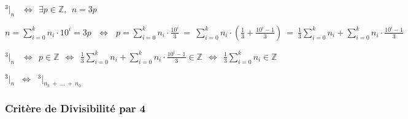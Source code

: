 \documentclass[a4paper]{article}
\begin{document}
\begin{center}
	{\LARGE $^3|_n$} $ ~~ \Longleftrightarrow ~~ \exists p \in \mathbb{Z}, ~~ n = 3p $\\
	
	\vspace{2mm}
		
	{\normalsize $ n = \sum\limits_{i=0}^k n_i \cdot 10^i = 3p ~~~ \Longleftrightarrow ~~~ p = \sum\limits_{i=0}^k n_i \cdot \frac{10^i}{3} ~ = ~ \sum\limits_{i=0}^k n_i \cdot \left( \frac{1}{3} + \frac{10^i-1}{3} \right) ~ = ~ \frac{1}{3} \sum\limits_{i=0}^k n_i + \sum\limits_{i=0}^k n_i \cdot \frac{10^i-1}{3}$}\\
	
	\vspace{2mm}
		
	{\Large $^3|_n$} {\normalsize $ ~~ \Longleftrightarrow ~~ p \in \mathbb{Z} ~~ \Longleftrightarrow ~~ \frac{1}{3}\sum\limits_{i=0}^k n_i + \sum\limits_{i=0}^k n_i \cdot \frac{10^i-1}{3} \in \mathbb{Z} ~~ \Longleftrightarrow ~~ \frac{1}{3}\sum\limits_{i=0}^k n_i \in \mathbb{Z}$ }
	
	\vspace{3mm}	
	
	{\LARGE $^3|_n$} $~ \Longleftrightarrow ~$ {\LARGE $^3|_{n_k ~ + ~ \dots ~ + ~ n_0}$}
	
\end{center}



\subsubsection*{Critère de Divisibilité par 4}
\end{document}
